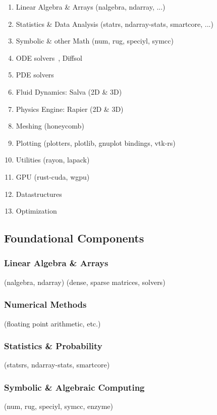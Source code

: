 \documentclass{article}
\begin{document}
\begin{enumerate}
    \item Linear Algebra \& Arrays (nalgebra, ndarray, ...)
    \item Statistics \& Data Analysis (statrs, ndarray-stats, smartcore, ...)
    \item Symbolic \& other Math (num, rug, speciyl, symcc)
    \item ODE solvers~\cite{Renevey2024}, Diffsol
    \item PDE solvers
    \item Fluid Dynamics: Salva (2D \& 3D)~\cite{Crozet2024}
    \item Physics Engine: Rapier (2D \& 3D)~\cite{Crozet2025}
    \item Meshing (honeycomb)
    \item Plotting (plotters, plotlib, gnuplot bindings, vtk-rs)
    \item Utilities (rayon, lapack)
    \item GPU (rust-cuda, wgpu)
    \item Datastructures
    \item Optimization
\end{enumerate}

\subsection{Foundational Components}
\subsubsection{Linear Algebra \& Arrays}
(nalgebra, ndarray) (dense, sparse matrices, solvers)

\subsubsection{Numerical Methods}
(floating point arithmetic, etc.)

\subsubsection{Statistics \& Probability}
(statsrs, ndarray-stats, smartcore)

\subsubsection{Symbolic \& Algebraic Computing}
(num, rug, speciyl, symcc, enzyme)
\end{document}
